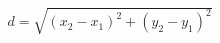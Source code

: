 \documentclass[preview]{standalone}
\begin{document}
\begin{align*}
d = \sqrt{(x_2 - x_1)^2 + (y_2 - y_1)^2}
\end{align*}
\end{document}

